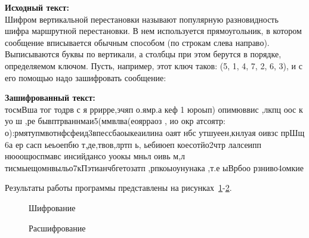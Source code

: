 \textbf{Исходный текст:} \\
    Шифром вертикальной перестановки называют популярную разновидность
    шифра маршрутной перестановки. В нем используется прямоугольник, в
    котором сообщение вписывается обычным способом (по строкам слева направо).
    Выписываются буквы по вертикали, а столбцы при этом берутся в порядке,
    определяемом ключом. Пусть, например, этот ключ таков: (5, 1, 4, 7, 2, 6, 3),
    и с его помощью надо зашифровать сообщение:

\textbf{Зашифрованный текст:} \\
    тосмВша тог тодрв с  я ррирре,эчяп о.ямр.а кеф 1 юроып) опимюввис ,лкпц
    оос к уо ш ,ре  бывптрваннмаи5(ммвлва(еоярраоз , ио окр атсоятр: 
    о):рмятупмвотнфсфеид3впессбаоыкеаилина оаят  нбс утшуеен,кнлуая оивзс прШщ
    6а ер сасп ьеьоепбю т,де,твов,лртп  ь, ьебиюеп коесотйо2чтр лалсеипп нюоощюспмавс
    инсийдансо уоокы мньл оивь м,л тисмыещомнвыльо7кПэтианчбгетозатп   ,рпкоыоунунака
    ,т.е ыВрбоо рзниво4омкие

Результаты работы программы представлены на рисунках~\ref{ris:encode-test-3}-\ref{ris:decode-test-3}.

\vspace{\baselineskip}
\begin{figure}[H]
    \caption{Шифрование}
\label{ris:encode-test-3}
\end{figure}

\vspace{\baselineskip}
\begin{figure}[H]
    \caption{Расшифрование}
\label{ris:decode-test-3}
\end{figure}

